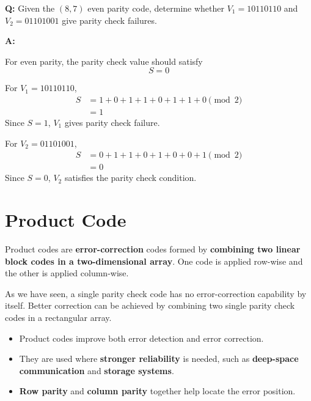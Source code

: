 \documentclass[11pt,a4paper]{book}
\newenvironment{definitionbox}[1][Definition]{%
    \begin{tcolorbox}[
        enhanced,
        breakable,
        colback=primaryblue!10,
        colframe=primaryblue!150,
        title=#1,
        fonttitle=\bfseries,
        sharp corners,
        boxrule=0.8pt,
        left=8pt,
        right=8pt,
        top=6pt,
        bottom=6pt
    ]
}{\end{tcolorbox}}
\newcounter{qna}[chapter]
\renewcommand{\theqna}{\thechapter.\arabic{qna}}
\newenvironment{questionanswerbox}[1][Example]{%
    \refstepcounter{qna}
    \begin{tcolorbox}[
        enhanced,
        breakable,
        colback=softlavender!10,
        colframe=softlavender!200,
        title={#1~\theqna},
        fonttitle=\bfseries,
        coltitle=white,
        colbacktitle=softlavender!200,
        sharp corners,
        boxrule=1pt,
        left=8pt,
        right=8pt,
        top=6pt,
        bottom=6pt
    ]
}{\end{tcolorbox}}
\begin{document}
\begin{questionanswerbox}[(8,7) Even Parity Check Example]
\textbf{Q:} Given the \((8,7)\) even parity code, determine whether \(V_1=10110110\) and \(V_2=01101001\) give parity check failures.

\textbf{A:}

For even parity, the parity check value should satisfy
\[
S=0
\]

For \(V_1=10110110\),
\begin{align*}
S &= 1+0+1+1+0+1+1+0 \pmod 2\\
  &= 1
\end{align*}
Since \(S=1\), \(V_1\) gives parity check failure.

\par\vspace{\baselineskip}

For \(V_2=01101001\),
\begin{align*}
S &= 0+1+1+0+1+0+0+1 \pmod 2\\
  &= 0
\end{align*}
Since \(S=0\), \(V_2\) satisfies the parity check condition.
\end{questionanswerbox}

\section{Product Code}

\begin{definitionbox}[Product Code]
Product codes are \textbf{error-correction} codes formed by \textbf{combining two linear block codes in a two-dimensional array}. One code is applied row-wise and the other is applied column-wise.
\end{definitionbox}

As we have seen, a single parity check code has no error-correction capability by itself. Better correction can be achieved by combining two single parity check codes in a rectangular array.

\begin{itemize}
    \item Product codes improve both error detection and error correction.
    \item They are used where \textbf{stronger reliability} is needed, such as \textbf{deep-space communication} and \textbf{storage systems}.
    \item \textbf{Row parity} and \textbf{column parity} together help locate the error position.
\end{itemize}
\end{document}
